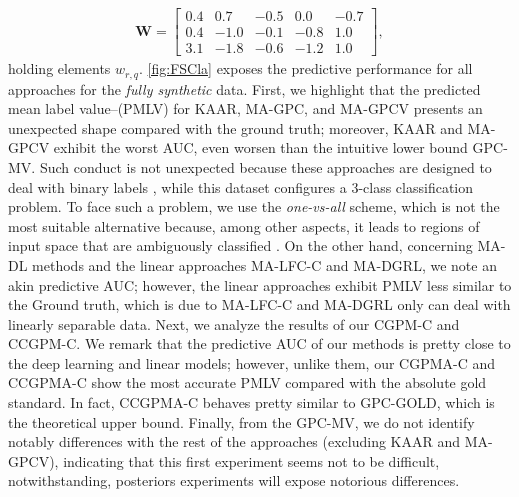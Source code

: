 \documentclass[journal]{IEEEtran}
\newcommand{\boldW}{\mathbf{W}}
\begin{document}
\begin{align}
\boldW=\begin{bmatrix}
0.4  &  0.7   & -0.5 &  0.0  & -0.7\\
0.4   &  -1.0  & -0.1  &  -0.8 & 1.0\\
3.1   &  -1.8  & -0.6  &  -1.2   & 1.0
\end{bmatrix},
\label{eq:parametersPC}
\end{align}
holding elements $w_{r,q}$. \cref{fig:FSCla} exposes the predictive performance for all approaches for the \textit{fully synthetic} data. First, we highlight that the predicted mean label value--(PMLV) for KAAR, MA-GPC, and MA-GPCV presents an unexpected shape compared with the ground truth; moreover, KAAR and MA-GPCV exhibit the worst AUC, even worsen than the intuitive lower bound GPC-MV. Such conduct is not unexpected because these approaches are designed to deal with binary labels \cite{gil2018learning,rodrigues2014gaussian,ruiz2019learning}, while this dataset configures a 3-class classification problem. To face such a problem, we use the \textit{one-vs-all} scheme, which is not the most suitable alternative because, among other aspects, it leads to regions of input space that are ambiguously classified \cite{bishop2006pattern}. On the other hand, concerning MA-DL methods and the linear approaches MA-LFC-C and MA-DGRL, we note an akin predictive AUC; however, the linear approaches exhibit PMLV less similar to the Ground truth, which is due to MA-LFC-C and MA-DGRL only can deal with linearly separable data. Next, we analyze the results of our CGPM-C and CCGPM-C. We remark that the predictive AUC of our methods is pretty close to the deep learning and linear models; however, unlike them, our CGPMA-C and CCGPMA-C show the most accurate PMLV compared with the absolute gold standard. In fact, CCGPMA-C behaves pretty similar to GPC-GOLD, which is the theoretical upper bound. Finally, from the GPC-MV, we do not identify notably differences with the rest of the approaches (excluding KAAR and MA-GPCV), indicating that this first experiment seems not to be difficult, notwithstanding, posteriors experiments will expose notorious differences.\\
\end{document}
